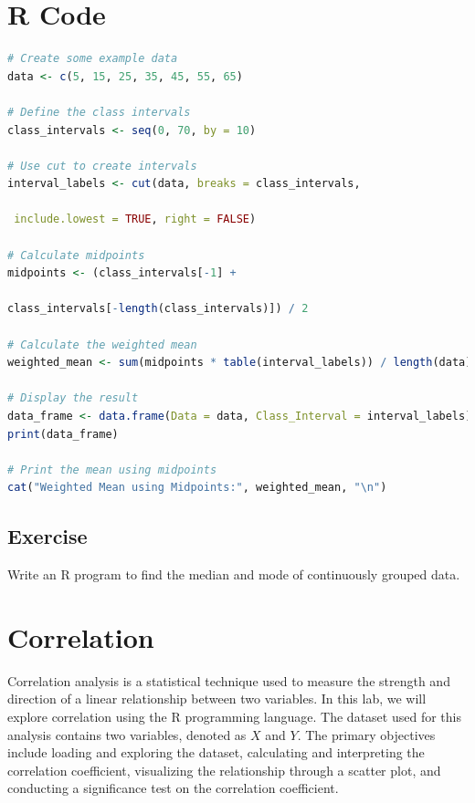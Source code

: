 \documentclass[10pt]{book}
\begin{document}
\section*{R Code}
\begin{lstlisting}[language=R, caption={R Code for Calculating Weighted Mean}, label={lst:weighted_mean}]
# Create some example data
data <- c(5, 15, 25, 35, 45, 55, 65)

# Define the class intervals
class_intervals <- seq(0, 70, by = 10)

# Use cut to create intervals
interval_labels <- cut(data, breaks = class_intervals,

 include.lowest = TRUE, right = FALSE)

# Calculate midpoints
midpoints <- (class_intervals[-1] + 

class_intervals[-length(class_intervals)]) / 2

# Calculate the weighted mean
weighted_mean <- sum(midpoints * table(interval_labels)) / length(data)

# Display the result
data_frame <- data.frame(Data = data, Class_Interval = interval_labels)
print(data_frame)

# Print the mean using midpoints
cat("Weighted Mean using Midpoints:", weighted_mean, "\n")
\end{lstlisting}

\subsection{Exercise}

Write an R program to find the median and mode of continuously grouped data.

\newpage


\section{Correlation}

Correlation analysis is a statistical technique used to measure the strength and direction of a linear relationship between two variables. In this lab, we will explore correlation using the R programming language. The dataset used for this analysis contains two variables, denoted as \(X\) and \(Y\). The primary objectives include loading and exploring the dataset, calculating and interpreting the correlation coefficient, visualizing the relationship through a scatter plot, and conducting a significance test on the correlation coefficient.
\end{document}
